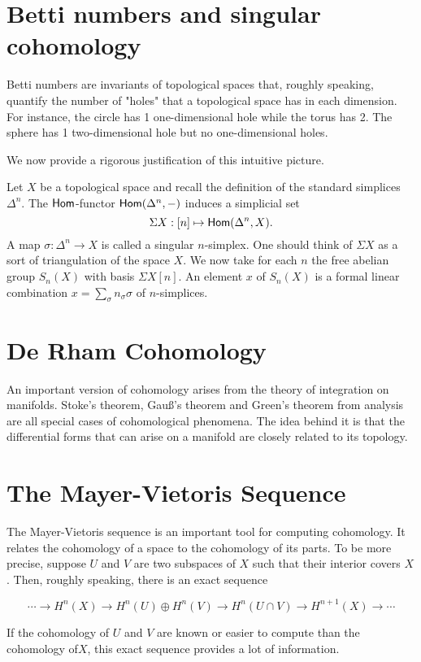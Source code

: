 \section{Betti numbers and singular cohomology}
Betti numbers are invariants of topological spaces that, roughly speaking, quantify the number of "holes" that a topological space has in each dimension. For instance, the circle has 1 one-dimensional hole while the torus has 2. The sphere has 1 two-dimensional hole but no one-dimensional holes. 

We now provide a rigorous justification of this intuitive picture.

Let $X$ be a topological space and recall the definition of the standard simplices $\Delta^n$. The $\mathsf{Hom}$-functor $\mathsf{Hom}(\Delta^n, -)$ induces a simplicial set
\[\Sigma X: [n] \mapsto \mathsf{Hom}(\Delta^n, X).\]
A map $\sigma : \Delta^n \to X$ is called a singular $n$-simplex. One should think of $\Sigma X$ as a sort of triangulation of the space $X$. We now take for each $n$ the free abelian group $S_n(X)$ with basis $\Sigma X[n]$. An element $x$ of $S_n(X)$ is a formal linear combination $x = \sum_\sigma n_\sigma \sigma$ of $n$-simplices. 

\section{De Rham Cohomology}

An important version of cohomology arises from the theory of integration on manifolds. Stoke's theorem, Gauß's theorem and Green's theorem from analysis are all special cases of cohomological phenomena. The idea behind it is that the differential forms that can arise on a manifold are closely related to its topology. 

\section{The Mayer-Vietoris Sequence}

The Mayer-Vietoris sequence is an important tool for computing cohomology. It relates the cohomology of a space to the cohomology of its parts. To be more precise, suppose $U$ and $V$ are two subspaces of $X$ such that their interior covers $X$. Then, roughly speaking, there is an exact sequence

\[
\cdots \to H^n(X) \to H^n(U) \oplus  H^n(V) \to H^n(U\cap V) \to H^{n+1}(X) \to \cdots
\]

If the cohomology of $U$ and $V$ are known or easier to compute than the cohomology of$X$, this exact sequence provides a lot of information.


